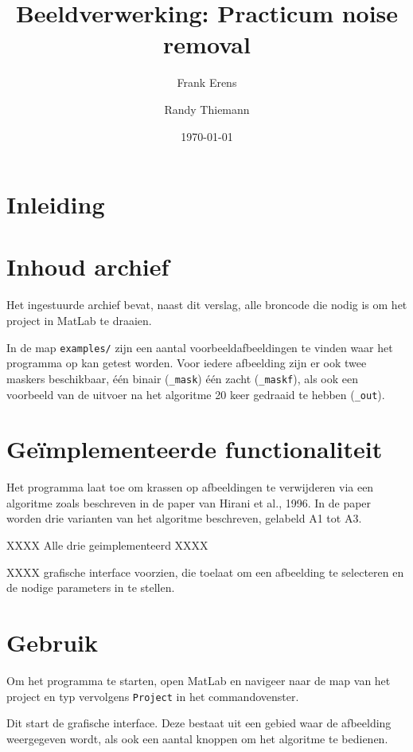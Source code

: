 \documentclass[a4paper,12pt]{article}
\begin{document}
\title{Beeldverwerking: Practicum noise removal}
\author{Frank Erens \and Randy Thiemann}
\date{\isodate\today}
\maketitle

\section{Inleiding}


\section{Inhoud archief}

Het ingestuurde archief bevat, naast dit verslag, alle broncode die nodig is om
het project in MatLab te draaien. 

In de map \texttt{examples/} zijn een aantal voorbeeldafbeeldingen te vinden
waar het programma op kan getest worden. Voor iedere afbeelding zijn er ook
twee maskers beschikbaar, \'e\'en binair (\texttt{\_mask}) \'e\'en zacht 
(\texttt{\_maskf}), als ook een voorbeeld van de uitvoer na het algoritme 20
keer gedraaid te hebben (\texttt{\_out}).

\section{Ge\"implementeerde functionaliteit}

Het programma laat toe om krassen op afbeeldingen te verwijderen via een
algoritme zoals beschreven in de paper van Hirani et al., 1996. In de paper
worden drie varianten van het algoritme beschreven, gelabeld A1 tot A3. 

\todo{}
XXXX Alle drie geimplementeerd XXXX

\todo{}
XXXX grafische interface voorzien, die toelaat om een afbeelding te selecteren
en de nodige parameters in te stellen.

\section{Gebruik}

Om het programma te starten, open MatLab en navigeer naar de map van het
project en typ vervolgens \texttt{Project} in het commandovenster.

Dit start de grafische interface. Deze bestaat uit een gebied waar de
afbeelding weergegeven wordt, als ook een aantal knoppen om het algoritme te
bedienen.
\end{document}
